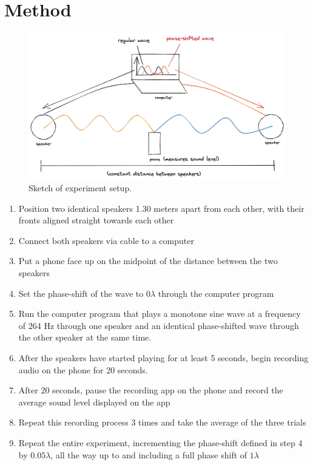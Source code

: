 \documentclass[index]{subfiles}
\begin{document}
\section{Method}

\begin{figure}[H]
    \centering
    \includegraphics[scale=0.22]{res/sound_diagram.png}
    \caption{Sketch of experiment setup.}
\end{figure}

\begin{enumerate}
    \item Position two identical speakers 1.30 meters apart from each other, with their fronts aligned straight towards each other
    \item Connect both speakers via cable to a computer
    \item Put a phone face up on the midpoint of the distance between the two speakers
    \item Set the phase-shift of the wave to \(0\lambda\) through the computer program
    \item Run the computer program that plays a monotone sine wave at a frequency of 264 Hz through one speaker and an identical phase-shifted wave through the other speaker at the same time.
    \item After the speakers have started playing for at least 5 seconds, begin recording audio on the phone for 20 seconds.
    \item After 20 seconds, pause the recording app on the phone and record the average sound level displayed on the app
    \item Repeat this recording process 3 times and take the average of the three trials
    \item Repeat the entire experiment, incrementing the phase-shift defined in step 4 by \(0.05\lambda\), all the way up to and including a full phase shift of \(1\lambda\)
\end{enumerate}
\end{document}
